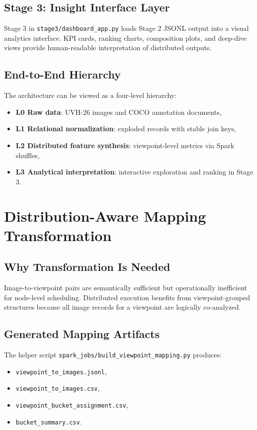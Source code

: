 \documentclass[journal,onecolumn]{IEEEtran}
\begin{document}
\subsection{Stage 3: Insight Interface Layer}
Stage 3 in \texttt{stage3/dashboard\_app.py} loads Stage 2 JSONL output into a visual analytics interface. KPI cards, ranking charts, composition plots, and deep-dive views provide human-readable interpretation of distributed outputs.

\subsection{End-to-End Hierarchy}
The architecture can be viewed as a four-level hierarchy:
\begin{itemize}
    \item \textbf{L0 Raw data}: UVH-26 images and COCO annotation documents,
    \item \textbf{L1 Relational normalization}: exploded records with stable join keys,
    \item \textbf{L2 Distributed feature synthesis}: viewpoint-level metrics via Spark shuffles,
    \item \textbf{L3 Analytical interpretation}: interactive exploration and ranking in Stage 3.
\end{itemize}

\section{Distribution-Aware Mapping Transformation}

\subsection{Why Transformation Is Needed}
Image-to-viewpoint pairs are semantically sufficient but operationally inefficient for node-level scheduling. Distributed execution benefits from viewpoint-grouped structures because all image records for a viewpoint are logically co-analyzed.

\subsection{Generated Mapping Artifacts}
The helper script \texttt{spark\_jobs/build\_viewpoint\_mapping.py} produces:
\begin{itemize}
    \item \texttt{viewpoint\_to\_images.jsonl},
    \item \texttt{viewpoint\_to\_images.csv},
    \item \texttt{viewpoint\_bucket\_assignment.csv},
    \item \texttt{bucket\_summary.csv}.
\end{itemize}
\end{document}
